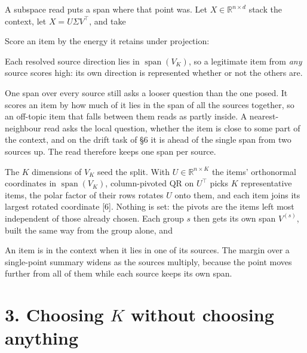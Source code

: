\documentclass[10pt,letterpaper,twocolumn]{article}
\begin{document}
A subspace read puts a span where that point was. Let \(X \in \mathbb{R}^{n \times d}\) stack the
context, let \(X = U\Sigma V^\top\), and take


Score an item by the energy it retains under projection:


Each resolved source direction lies in \(\operatorname{span}(V_K)\), so a legitimate item from
\emph{any} source scores high: its own direction is represented whether or not the others are.

One span over every source still asks a looser question than the one posed. It scores an item by
how much of it lies in the span of all the sources together, so an off-topic item that falls
between them reads as partly inside. A nearest-neighbour read asks the local question, whether
the item is close to some part of the context, and on the drift task of §6 it is ahead of the
single span from two sources up. The read therefore keeps one span per source.

The \(K\) dimensions of \(V_K\) seed the split. With \(U \in \mathbb{R}^{n \times K}\) the items'
orthonormal coordinates in \(\operatorname{span}(V_K)\), column-pivoted QR on \(U^\top\) picks \(K\)
representative items, the polar factor of their rows rotates \(U\) onto them, and each item joins
its largest rotated coordinate {[}6{]}. Nothing is set: the pivots are the items left most
independent of those already chosen. Each group \(s\) then gets its own span \(V^{(s)}\), built the
same way from the group alone, and


An item is in the context when it lies in one of its sources. The margin over a single-point
summary widens as the sources multiply, because the point moves further from all of them while
each source keeps its own span.

\section{\texorpdfstring{3. Choosing \(K\) without choosing anything}{3. Choosing K without choosing anything}}\label{3-choosing-k-without-choosing-anything}
\end{document}
